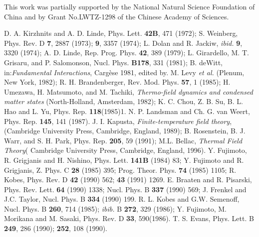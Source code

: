 \documentclass[twocolumn,prd,showpacs,a4paper]{revtex4}
\begin{document}
This work was partially supported by the National Natural Science Foundation
of China and by Grant No.LWTZ-1298 of the Chinese Academy of Sciences.
\begin{references}
  D. A. Kirzhnits and A. D. Linde, Phys. Lett.  \textbf{42B}, 471
                (1972);
                S. Weinberg, Phys. Rev. D \textbf{7}, 2887 (1973);
                \textbf{9}, 3357 (1974); 
                L. Dolan and R. Jackiw, \textit{ibid.} \textbf{9}, 3320 (1974);
                A. D. Linde, Rep. Prog. Phys. \textbf{42}, 389 (1979);
                L. Girardello, M. T. Grisaru, and P. Salomonson, Nucl. Phys.
                \textbf{B178}, 331 (1981);
                B. deWitt, in:\textit {Fundamental Interactions}, Carg\`{e}se 1981,
                edited by. M. Levy \textit {et al.} (Plenum, New York, 1982);
                R. H. Brandenberger, Rev. Mod. Phys. \textbf {57}, 1 (1985);
H. Umezawa, H. Matsumoto, and M. Tachiki, \textit{Thermo-field
                dynamics and condensed matter states} (North-Holland, Amsterdam,
                1982);
                K. C. Chou, Z. B. Su, B. L. Hao and L. Yu, Phys. Rep. 
                \textbf {118}(1985)1.
  N. P. Landsman and Ch. G. van Weert, Phys. Rep. \textbf{145},
                141 (1987). 
  J. I. Kapusta, \textit{Finite-temperature field theory}, (Cambridge University Press, Cambridge, England, 1989);
                B. Rosenstein, B. J. Warr, and S. H. Park, Phys. Rep. \textbf{205},
                59 (1991); 
                M.L. Bellac,  \textit{Thermal Field Theory}( Cambridge University
                Press, Cambridge, England, 1996). 
  Y. Fujimoto, R. Grigjanis and H. Nishino,  Phys. Lett. 
                \textbf{141B} (1984) 83;
                Y. Fujimoto and R. Grigjanis, Z. Phys. C \textbf{28} (1985) 395;
                      Prog. Theor. Phys. \textbf{74} (1985) 1105;
                R. Kobes, Phys. Rev. D \textbf{42} (1990) 562; \textbf{43} (1991) 1269.
                E. Braaten and R. Pisarski, Phys. Rev. Lett. \textbf{64} (1990) 1338;                      Nucl. Phys. B \textbf{337} (1990) 569;
                J. Frenkel and J.C. Taylor, Nucl. Phys. B \textbf{334} (1990) 199. 
  R. L. Kobes and G.W. Semenoff, Nucl. Phys. B \textbf{260}, 714 (1985);                 \textit{ibib.} B \textbf{272}, 329 (1986);
                Y. Fujimoto, M. Morikana and M. Sasaki, Phys. Rev. D \textbf{33}, 
                590(1986).
  T. S. Evans, Phys. Lett. B \textbf{249}, 286 (1990); \textbf{252}, 108 (1990).  

\end{references}
\end{document}
